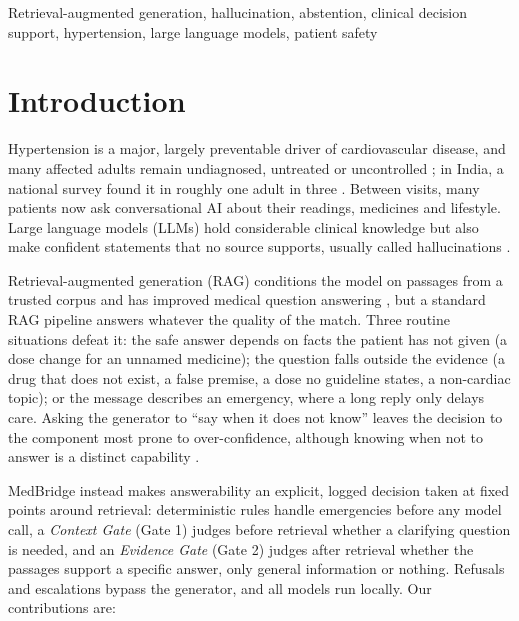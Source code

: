 \documentclass[conference]{IEEEtran}
\begin{document}
\begin{IEEEkeywords}
Retrieval-augmented generation, hallucination, abstention, clinical decision support, hypertension, large language models, patient safety
\end{IEEEkeywords}

\section{Introduction}\label{sec:intro}

Hypertension is a major, largely preventable driver of cardiovascular disease, and many affected adults remain undiagnosed, untreated or uncontrolled \cite{who2023globalreport}; in India, a national survey found it in roughly one adult in three \cite{anjana2023indiab}. Between visits, many patients now ask conversational AI about their readings, medicines and lifestyle. Large language models (LLMs) hold considerable clinical knowledge \cite{singhal2023llmclinical} but also make confident statements that no source supports, usually called hallucinations \cite{ji2023survey}.

Retrieval-augmented generation (RAG) conditions the model on passages from a trusted corpus \cite{lewis2020rag} and has improved medical question answering \cite{xiong2024medrag}, but a standard RAG pipeline answers whatever the quality of the match. Three routine situations defeat it: the safe answer depends on facts the patient has not given (a dose change for an unnamed medicine); the question falls outside the evidence (a drug that does not exist, a false premise, a dose no guideline states, a non-cardiac topic); or the message describes an emergency, where a long reply only delays care. Asking the generator to ``say when it does not know'' leaves the decision to the component most prone to over-confidence, although knowing when not to answer is a distinct capability \cite{wen2025abstention}.

MedBridge instead makes answerability an explicit, logged decision taken at fixed points around retrieval: deterministic rules handle emergencies before any model call, a \emph{Context Gate} (Gate 1) judges before retrieval whether a clarifying question is needed, and an \emph{Evidence Gate} (Gate 2) judges after retrieval whether the passages support a specific answer, only general information or nothing. Refusals and escalations bypass the generator, and all models run locally. Our contributions are:
\end{document}
